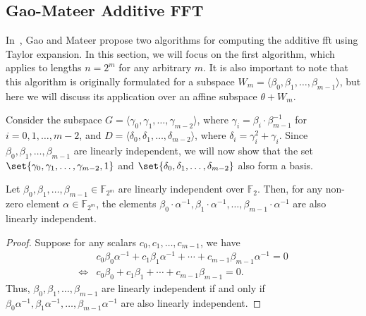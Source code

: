 
\subsection{Gao-Mateer Additive FFT}
\label{Pre:GaoMateer_Algo}


In~\cite{Gao2010FFT}, Gao and Mateer propose two algorithms for computing the additive \gls{fft} using Taylor expansion. In this section, we will focus on the first algorithm, which applies to lengths $n=2^m$ for any arbitrary $m$. It is also important to note that this algorithm is originally formulated for a subspace $W_m = \langle \beta_0, \beta_1, \ldots, \beta_{m-1} \rangle$, but here we will discuss its application over an affine subspace $\theta + W_m$.


Consider the subspace $G = \langle \gamma_0, \gamma_1, \ldots, \gamma_{m-2} \rangle$, where $\gamma_i = \beta_i \cdot \beta_{m-1}^{-1}$ for $i = 0, 1, \ldots, m-2$, and $D = \langle \delta_0, \delta_1, \ldots, \delta_{m-2} \rangle$, where $\delta_i = \gamma_i^2 + \gamma_i$. Since $\beta_0, \beta_1, \ldots, \beta_{m-1}$ are linearly independent, we will now show that the set $\set{\gamma_0, \gamma_1, \ldots, \gamma_{m-2}, 1}$ and $\set{\delta_0, \delta_1, \ldots, \delta_{m-2}}$ also form a basis.

\begin{theorem}\label{Th:Gao-Mateer-basis}
	Let $\beta_0,\beta_1,\ldots,\beta_{m-1} \in \mathbb{F}_{2^m}$ are linearly independent over $\mathbb{F}_2$. Then, for any non-zero element $\alpha \in \mathbb{F}_{2^m}$, the elements $\beta_0\cdot \alpha^{-1},\beta_1 \cdot \alpha^{-1},\ldots,\beta_{m-1} \cdot \alpha^{-1}$ are also linearly independent.
\end{theorem}

\begin{proof}
	Suppose for any scalars $c_0,c_1,\ldots,c_{m-1}$, we have
	\begin{equation*}
		\begin{aligned}
			&c_0 \beta_0 \alpha^{-1}+ c_1 \beta_1 \alpha^{-1}+ \cdots + c_{m-1} \beta_{m-1} \alpha^{-1}=0\\
			\iff & c_0 \beta_0+ c_1 \beta_1 + \cdots + c_{m-1} \beta_{m-1} =0.
		\end{aligned}
	\end{equation*}
	Thus, $\beta_0,\beta_1,\ldots,\beta_{m-1}$ are linearly independent if and only if $\beta_0 \alpha^{-1},\beta_1 \alpha^{-1},\ldots,\beta_{m-1} \alpha^{-1}$ are also linearly independent.
\end{proof}

